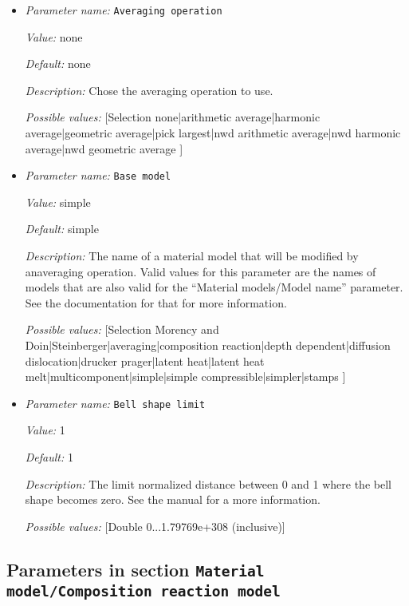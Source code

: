 \begin{itemize}
\item {\it Parameter name:} {\tt Averaging operation}
\label{parameters:Material model/Averaging/Averaging operation}


{\it Value:} none


{\it Default:} none


{\it Description:} Chose the averaging operation to use.


{\it Possible values:} [Selection none|arithmetic average|harmonic average|geometric average|pick largest|nwd arithmetic average|nwd harmonic average|nwd geometric average ]
\item {\it Parameter name:} {\tt Base model}
\label{parameters:Material model/Averaging/Base model}


{\it Value:} simple


{\it Default:} simple


{\it Description:} The name of a material model that will be modified by anaveraging operation. Valid values for this parameter are the names of models that are also valid for the ``Material models/Model name'' parameter. See the documentation for that for more information.


{\it Possible values:} [Selection Morency and Doin|Steinberger|averaging|composition reaction|depth dependent|diffusion dislocation|drucker prager|latent heat|latent heat melt|multicomponent|simple|simple compressible|simpler|stamps ]
\item {\it Parameter name:} {\tt Bell shape limit}
\label{parameters:Material model/Averaging/Bell shape limit}


{\it Value:} 1


{\it Default:} 1


{\it Description:} The limit normalized distance between 0 and 1 where the bell shape becomes zero. See the manual for a more information.


{\it Possible values:} [Double 0...1.79769e+308 (inclusive)]
\end{itemize}

\subsection{Parameters in section \tt Material model/Composition reaction model}
\label{parameters:Material_20model/Composition_20reaction_20model}

